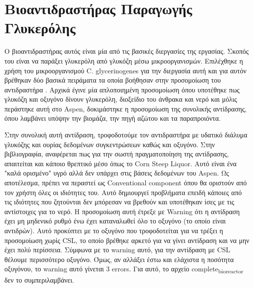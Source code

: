 \documentclass[11pt]{article}
\begin{document}
\section{Βιοαντιδραστήρας Παραγωγής Γλυκερόλης}
\label{sec:orgb476901}
Ο βιοαντιδραστήρας αυτός είναι μία από τις βασικές διεργασίες της εργασίας. Σκοπός του είναι να παράξει γλυκερόλη από γλυκόζη μέσω μικροοργανισμών. Επιλέχθηκε η χρήση του μικροοργανισμού C. glycerinogenes για την διεργασία αυτή και για αυτόν βρέθηκαν δύο βασικά πειράματα τα οποία βοήθησαν στην προσομοίωση του αντιδραστήρα \cite{zhugeGlycerolProductionNovel2001,jinByproductFormationNovel2003} . Αρχικά έγινε μία απλοποιημένη προσομοίωση όπου υποτέθηκε πως γλυκόζη και οξυγόνο δίνουν γλυκερόλη, διοξείδιο του άνθρακα και νερό και μόλις περάστηκε αυτή στο Aspen, δοκιμάστηκε η προσομοίωση της συνολικής αντίδρασης, όπου λαμβάνει υπόψην την βιομάζα, την πηγή αζώτου και τα παραπροιόντα.

Στην συνολική αυτή αντίδραση, τροφοδοτούμε τον αντιδραστήρα με υδατικό διάλυμα γλυκόζης και ουρίας δεδομένων συγκεντρώσεων καθώς και οξυγόνο. Στην βιβλιογραφία, αναφέρεται πως για την σωστή πραγματοποίηση της αντίδρασης, απαιτείται και κάποιο θρεπτικό μέσο όπως το Corn Steep Liquor. Αυτό είναι ένα "καλά ορισμένο" υγρό αλλά δεν υπάρχει στις βάσεις δεδομένων του Aspen. Ως αποτέλεσμα, πρέπει να περαστεί ως Conventional component όπου θα οριστούν από τον χρήστη όλες οι ιδιότητες του. Αυτό δημιουργεί προβλήματα επειδή κάποιες από τις ιδιότητες που ζητούνται δεν μπόρεσαν να βρεθούν και υποτέθηκαν ίσες με τις αντίστοιχες για το νερό. Η προσομοίωση αυτή έτρεξε με Warning ότι η αντίδραση έχει μη μηδενικό ρυθμό ένω έχει καταναλωθεί όλο το οξυγόνο (το οποίο είναι αντιδρών). Αυτό προκύπτει με το οξυγόνο που τροφοδοτείται για να τρέξει η προσομοίωση χωρίς CSL, το οποίο βρέθηκε αρκετό για να γίνει αντίδραση και να μην έχει πολύ περίσσεια. Σύμφωνα με το warning αυτό, για την αντίδραση με CSL θέλουμε περισσότερο οξυγόνο. Όμως, αν αλλάξει έστω και ελάχιστα η ποσότητα οξυγόνου, το warning αυτό γίνεται 3 errors. Για αυτό, το αρχείο complete\textsubscript{bioreactor} δεν το συμπεριλαμβάνει.
\end{document}
